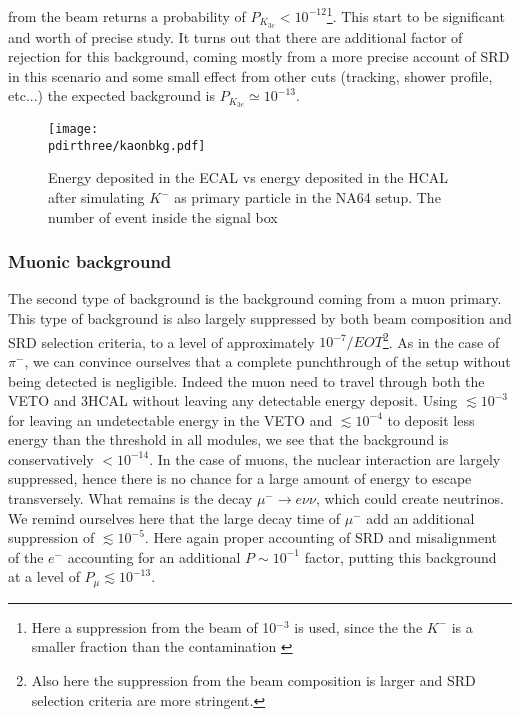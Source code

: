 from the beam returns a probability of $P_{K_{3e}} < 10^{-12}$\footnote{Here a suppression from the beam of 10$^{-3}$ is used, since the the $K^-$ is a smaller fraction than the contamination \cite{h4-beamline}}. This start to be significant and worth of precise study. It turns out that there are additional factor of rejection for this background, coming mostly from a more precise account of SRD in this scenario and some small effect from other cuts (tracking, shower profile, etc...) the expected background is $P_{K_{3e}} \simeq 10^{-13}$.


\begin{figure}[bth!]
  \centering
  \texttt{[image: \\pdirthree/kaonbkg.pdf]}
  \caption[$K^-$ simulation ]{Energy deposited in the ECAL vs energy deposited in the HCAL after simulating $K^-$ as primary particle in the NA64 setup. The number of event inside the signal box}
  \label{fig:kaonbkg-sim}
\end{figure}

\subsubsection{Muonic background}
\label{ch3:sec:bkg:inv:muon}

The second type of background is the background coming from a muon primary. This type of background is also largely suppressed by both beam composition and SRD selection criteria, to a level of approximately $10^{-7}/EOT$\footnote{Also here the suppression from the beam composition is larger \cite{h4-beamline} and SRD selection criteria are more stringent.}. As in the case of $\pi^-$, we can convince ourselves that a complete punchthrough of the setup without being detected is negligible. Indeed the muon need to travel through both the VETO and 3HCAL without leaving any detectable energy deposit. Using $\lesssim 10^{-3}$ for leaving an undetectable energy in the VETO and $\lesssim 10^{-4}$ to deposit less energy than the threshold in all modules, we see that the background is conservatively $< 10^{-14}$. In the case of muons, the nuclear interaction are largely suppressed, hence there is no chance for a large amount of energy to escape transversely. What remains is the decay $\mu^- \rightarrow e\nu\nu$, which could create neutrinos. We remind ourselves here that the large decay time of $\mu^-$ add an additional suppression of $\lesssim 10^{-5}$. Here again proper accounting of SRD and misalignment of the $e^-$ accounting for an additional $P\sim 10^{-1}$ factor, putting this background at a level of $P_{\mu} \lesssim 10^{-13}$.

